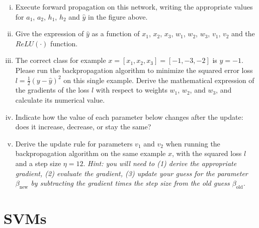 \documentclass[11pt]{article}
\begin{document}
\begin{enumerate}
\begin{enumerate}[(i) ]
    \item Execute forward propagation on this network, writing the appropriate values for $a_1$, $a_2$, $h_1$, $h_2$ and $\hat{y}$ in the figure above.
    \item Give the expression of $\hat{y}$ as a function of $x_1$, $x_2$, $x_3$, $w_1$, $w_2$, $w_3$, $v_1$, $v_2$ and the $ReLU(\cdot)$ function.
    \item The correct class for example $x = [x_1, x_2, x_3] = [-1, -3, -2]$ is $y = -1$. Please run the backpropagation algorithm to minimize the squared error loss $l = \frac{1}{2}(y - \hat{y})^2$ on this single example. Derive the mathematical expression of the gradients of the loss $l$ with respect to weights $w_1$, $w_2$, and $w_3$, and calculate its numerical value.
    \item Indicate how the value of each parameter below changes after the update: does it increase, decrease, or stay the same?
    \item Derive the update rule for parameters $v_1$ and $v_2$ when running the backpropagation algorithm on the same example $x$, with the squared loss $l$ and a step size $\eta = {1}{2}$. \textit{Hint: you will need to (1) derive the appropriate gradient, (2) evaluate the gradient, (3) update your guess for the parameter $\beta_{\text{new}}$ by subtracting the gradient times the step size from the old guess $\beta_{\text{old}}$.}
\end{enumerate}

\begin{answertext}{22cm}{}


  
\end{answertext} 

\end{enumerate}

\pagebreak
\section{SVMs}
\end{document}
